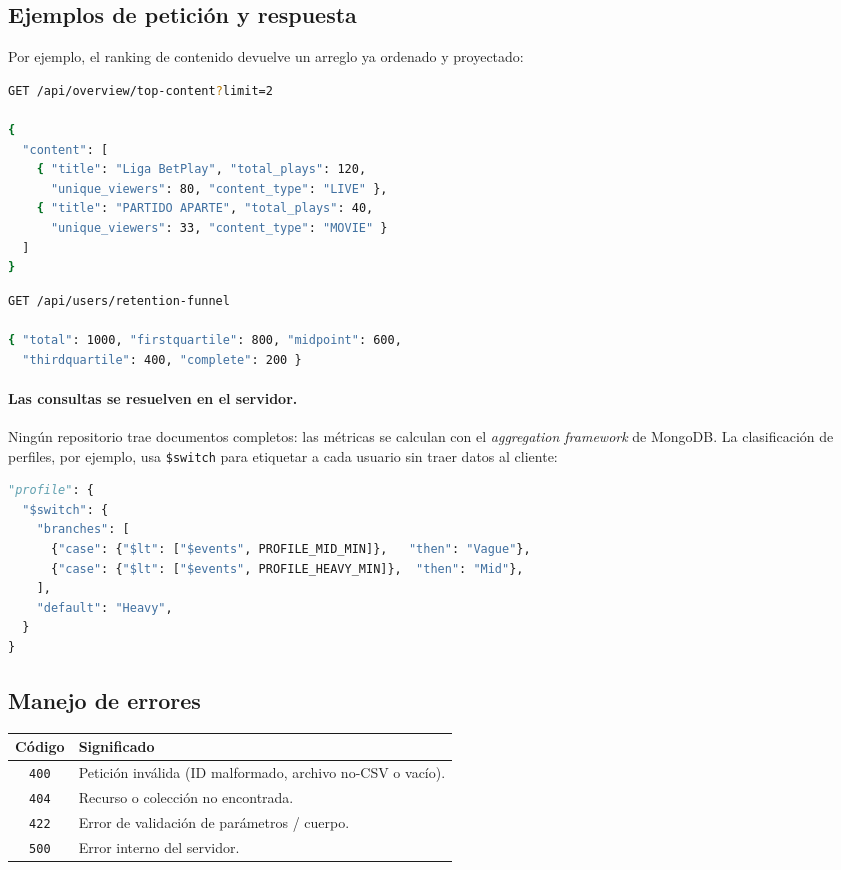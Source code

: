 \documentclass[12pt, letterpaper]{article}
\newcommand{\code}[1]{\texttt{#1}}
\begin{document}
\subsection{Ejemplos de petición y respuesta}
Por ejemplo, el ranking de contenido devuelve un arreglo ya ordenado y
proyectado:

\begin{lstlisting}[language=bash,caption={Petición y respuesta de top-content}]
GET /api/overview/top-content?limit=2

{
  "content": [
    { "title": "Liga BetPlay", "total_plays": 120,
      "unique_viewers": 80, "content_type": "LIVE" },
    { "title": "PARTIDO APARTE", "total_plays": 40,
      "unique_viewers": 33, "content_type": "MOVIE" }
  ]
}
\end{lstlisting}

\begin{lstlisting}[language=bash,caption={Respuesta del funnel de retención}]
GET /api/users/retention-funnel

{ "total": 1000, "firstquartile": 800, "midpoint": 600,
  "thirdquartile": 400, "complete": 200 }
\end{lstlisting}

\paragraph{Las consultas se resuelven en el servidor.} Ningún repositorio trae
documentos completos: las métricas se calculan con el \emph{aggregation
framework} de MongoDB. La clasificación de perfiles, por ejemplo, usa
\code{\$switch} para etiquetar a cada usuario sin traer datos al cliente:

\begin{lstlisting}[language=Python,caption={Clasificación de perfiles con \$switch (db/repositories/users.py)}]
"profile": {
  "$switch": {
    "branches": [
      {"case": {"$lt": ["$events", PROFILE_MID_MIN]},   "then": "Vague"},
      {"case": {"$lt": ["$events", PROFILE_HEAVY_MIN]},  "then": "Mid"},
    ],
    "default": "Heavy",
  }
}
\end{lstlisting}

\subsection{Manejo de errores}
\begin{center}
\begin{tabular}{@{}cl@{}}
\toprule
\textbf{Código} & \textbf{Significado} \\
\midrule
\code{400} & Petición inválida (ID malformado, archivo no-CSV o vacío). \\
\code{404} & Recurso o colección no encontrada. \\
\code{422} & Error de validación de parámetros / cuerpo. \\
\code{500} & Error interno del servidor. \\
\bottomrule
\end{tabular}
\end{center}
\end{document}
